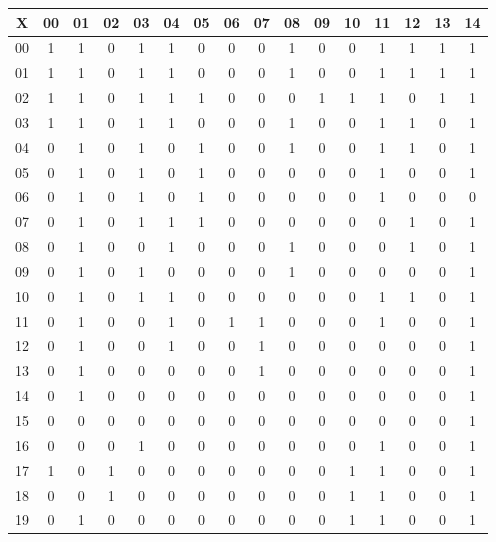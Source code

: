 \begin{esempio}
\begin{table}[H]
\begin{tabular}{c|ccccccccccccccc}
    X & 00 & 01 & 02 & 03 & 04 & 05 & 06 & 07 & 08 & 09 & 10 & 11 & 12 & 13
    & 14 \\
    \hline
    00 & 1 & 1 & 0 & 1 & 1 & 0 & 0 & 0 & 1 & 0 & 0 & 1 & 1 & 1 & 1 \\
    01 & 1 & 1 & 0 & 1 & 1 & 0 & 0 & 0 & 1 & 0 & 0 & 1 & 1 & 1 & 1 \\
    02 & 1 & 1 & 0 & 1 & 1 & 1 & 0 & 0 & 0 & 1 & 1 & 1 & 0 & 1 & 1 \\
    03 & 1 & 1 & 0 & 1 & 1 & 0 & 0 & 0 & 1 & 0 & 0 & 1 & 1 & 0 & 1 \\
    04 & 0 & 1 & 0 & 1 & 0 & 1 & 0 & 0 & 1 & 0 & 0 & 1 & 1 & 0 & 1 \\
    05 & 0 & 1 & 0 & 1 & 0 & 1 & 0 & 0 & 0 & 0 & 0 & 1 & 0 & 0 & 1 \\
    06 & 0 & 1 & 0 & 1 & 0 & 1 & 0 & 0 & 0 & 0 & 0 & 1 & 0 & 0 & 0 \\
    07 & 0 & 1 & 0 & 1 & 1 & 1 & 0 & 0 & 0 & 0 & 0 & 0 & 1 & 0 & 1 \\
    08 & 0 & 1 & 0 & 0 & 1 & 0 & 0 & 0 & 1 & 0 & 0 & 0 & 1 & 0 & 1 \\
    09 & 0 & 1 & 0 & 1 & 0 & 0 & 0 & 0 & 1 & 0 & 0 & 0 & 0 & 0 & 1 \\
    10 & 0 & 1 & 0 & 1 & 1 & 0 & 0 & 0 & 0 & 0 & 0 & 1 & 1 & 0 & 1 \\
    11 & 0 & 1 & 0 & 0 & 1 & 0 & 1 & 1 & 0 & 0 & 0 & 1 & 0 & 0 & 1 \\
    12 & 0 & 1 & 0 & 0 & 1 & 0 & 0 & 1 & 0 & 0 & 0 & 0 & 0 & 0 & 1 \\
    13 & 0 & 1 & 0 & 0 & 0 & 0 & 0 & 1 & 0 & 0 & 0 & 0 & 0 & 0 & 1 \\
    14 & 0 & 1 & 0 & 0 & 0 & 0 & 0 & 0 & 0 & 0 & 0 & 0 & 0 & 0 & 1 \\
    15 & 0 & 0 & 0 & 0 & 0 & 0 & 0 & 0 & 0 & 0 & 0 & 0 & 0 & 0 & 1 \\
    16 & 0 & 0 & 0 & 1 & 0 & 0 & 0 & 0 & 0 & 0 & 0 & 1 & 0 & 0 & 1 \\
    17 & 1 & 0 & 1 & 0 & 0 & 0 & 0 & 0 & 0 & 0 & 1 & 1 & 0 & 0 & 1 \\
    18 & 0 & 0 & 1 & 0 & 0 & 0 & 0 & 0 & 0 & 0 & 1 & 1 & 0 & 0 & 1 \\ 
    19 & 0 & 1 & 0 & 0 & 0 & 0 & 0 & 0 & 0 & 0 & 1 & 1 & 0 & 0 & 1
  \end{tabular}
\end{table}
\end{esempio}
